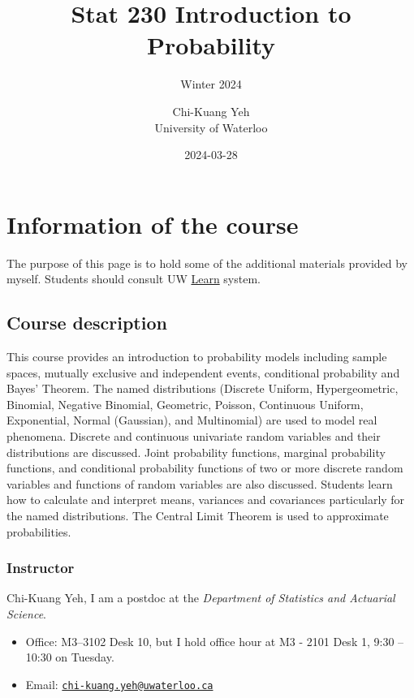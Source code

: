 \documentclass[
]{book}
\title{Stat 230 Introduction to Probability}
\subtitle{Winter 2024}
\author{Chi-Kuang Yeh\\
University of Waterloo}
\date{2024-03-28}
\providecommand{\tightlist}{%
  \setlength{\itemsep}{0pt}\setlength{\parskip}{0pt}}
\theoremstyle{definition}
\theoremstyle{definition}
\theoremstyle{definition}
\theoremstyle{definition}
\theoremstyle{remark}
\begin{document}
\maketitle

{
\setcounter{tocdepth}{1}
\tableofcontents
}
\chapter{Information of the course}\label{information-of-the-course}

The purpose of this page is to hold some of the additional materials provided by myself. Students should consult UW \href{https://api-4ccc589b.duosecurity.com/frame/v4/preauth/healthcheck?sid=frameless-c0657e9d-cb86-4ac9-a6a7-fd054ae21fd5}{Learn} system.

\section{Course description}\label{course-description}

This course provides an introduction to probability models including sample spaces, mutually exclusive and independent events, conditional probability and Bayes' Theorem. The named distributions (Discrete Uniform, Hypergeometric, Binomial, Negative Binomial, Geometric, Poisson, Continuous Uniform, Exponential, Normal (Gaussian), and Multinomial) are used to model real phenomena. Discrete and continuous univariate random variables and their distributions are discussed. Joint probability functions, marginal probability functions, and conditional probability functions of two or more discrete random variables and functions of random variables are also discussed. Students learn how to calculate and interpret means, variances and covariances particularly for the named distributions. The Central Limit Theorem is used to approximate probabilities.

\subsection{Instructor}\label{instructor}

Chi-Kuang Yeh, I am a postdoc at the \emph{Department of Statistics and Actuarial Science}.

\begin{itemize}
\tightlist
\item
  Office: M3--3102 Desk 10, but I hold office hour at M3 - 2101 Desk 1, 9:30 -- 10:30 on Tuesday.
\item
  Email: \href{mailto:chi-kuang.yeh@uwaterloo.ca}{\nolinkurl{chi-kuang.yeh@uwaterloo.ca}}
\end{itemize}
\end{document}
